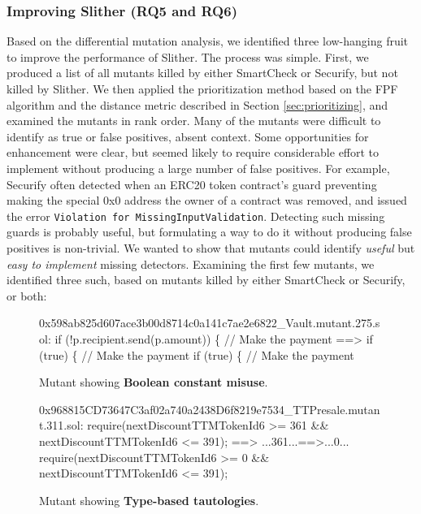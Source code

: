 \subsubsection{Improving Slither {\bf (RQ5 and RQ6)}}

Based on the differential mutation analysis, we identified three low-hanging fruit to improve the performance of Slither.  The process was simple.  First, we produced a list of all mutants killed by either SmartCheck or Securify, but not killed by Slither.  We then applied the prioritization method based on the FPF algorithm and the distance metric described in Section \ref{sec:prioritizing}, and examined the mutants in rank order.  Many of the mutants were difficult to identify as true or false positives, absent context.  Some opportunities for enhancement were clear, but seemed likely to require considerable effort to implement without producing a large number of false positives.  For example, Securify often detected when an ERC20 token contract's guard preventing making the special 0x0 address the owner of a contract was removed, and issued the error {\tt Violation for MissingInputValidation}. Detecting such missing guards is probably useful, but formulating a way to do it without producing false positives is non-trivial.  We wanted to show that mutants could identify \emph{useful} but \emph{easy to implement} missing detectors.  Examining the first few mutants, we identified three such, based on mutants killed by either SmartCheck or Securify, or both:

\begin{figure}
  {\scriptsize
\noindent \begin{code}
 0x598ab825d607ace3b00d8714c0a141c7ae2e6822\_Vault.mutant.275.sol:
 if (!p.recipient.send(p.amount)) \{  // Make the payment
 ==>          if (true) \{  // Make the payment
 if (true) \{  // Make the payment
      \end{code}
      }
      \caption{Mutant showing {\bf Boolean constant misuse}.}
      \label{fig:boolean}
    \end{figure}

    \begin{figure}
      {\scriptsize
\begin{code}
 0x968815CD73647C3af02a740a2438D6f8219e7534\_TTPresale.mutant.311.sol:
 require(nextDiscountTTMTokenId6 >= 361 \&\& nextDiscountTTMTokenId6 <= 391);
 ==>  ...361...==>...0...
 require(nextDiscountTTMTokenId6 >= 0 \&\& nextDiscountTTMTokenId6 <= 391);
      \end{code}
      }
      \caption{Mutant showing {\bf Type-based tautologies}.}
      \label{fig:tautology}      
\end{figure}

